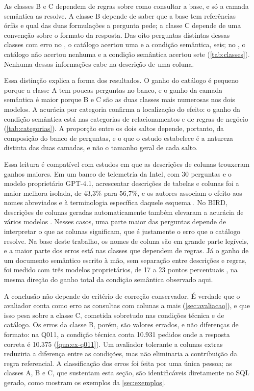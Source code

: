 As classes B e C dependem de regras sobre como consultar a base, e só a
camada semântica as resolve. A classe B depende de saber que a base tem
referências órfãs e qual das duas formulações a pergunta pede; a classe C
depende de uma convenção sobre o formato da resposta. Das oito perguntas
distintas dessas classes com erro no , o catálogo
acertou uma e a condição semântica, seis; no , o
catálogo não acertou nenhuma e a condição semântica acertou sete
(\autoref{tab:classes}). Nenhuma dessas informações cabe na descrição de
uma coluna.

Essa distinção explica a forma dos resultados. O ganho do catálogo é
pequeno porque a classe A tem poucas perguntas no banco, e o ganho da
camada semântica é maior porque B e C são as duas classes mais numerosas
nos dois modelos. A acurácia por categoria confirma a localização do
efeito: o ganho da condição semântica está nas categorias de
relacionamentos e de regras de negócio (\autoref{tab:categorias}). A
proporção entre os dois saltos depende, portanto, da composição do banco
de perguntas, e o que o estudo estabelece é a natureza distinta das duas
camadas, e não o tamanho geral de cada salto.

Essa leitura é compatível com estudos em que as descrições de colunas
trouxeram ganhos maiores. Em um banco de telemetria da Intel, com 30
perguntas e o modelo proprietário GPT-4.1, acrescentar descrições de
tabelas e colunas foi a maior melhora isolada, de 43,3\% para 56,7\%, e os
autores associam o efeito aos nomes abreviados e à terminologia
específica daquele esquema \cite{bouattour2026prompting}. No BIRD,
descrições de colunas geradas automaticamente também elevaram a acurácia
de vários modelos \cite{wretblad2024synthetic}. Nesses casos, uma parte
maior das perguntas depende de interpretar o que as colunas significam,
que é justamente o erro que o catálogo resolve. Na base deste trabalho, os
nomes de coluna são em grande parte legíveis, e a maior parte dos erros
está nas classes que dependem de regras. Já o ganho de um documento
semântico escrito à mão, sem separação entre descrições e regras, foi
medido com três modelos proprietários, de 17 a 23 pontos percentuais
\cite{rumiantsau2026semantic}, na mesma direção do ganho total da
condição semântica observado aqui.

A conclusão não depende do critério de correção conservador. É verdade
que o avaliador conta como erro as consultas com colunas a mais
(\autoref{sec:avaliacao}), e que isso pesa sobre a classe C, cometida
sobretudo nas condições técnica e de catálogo. Os erros da classe B,
porém, são valores errados, e não diferenças de formato: na Q011, a
condição técnica conta 10.931 pedidos onde a resposta correta é 10.375
(\autoref{qua:ex-q011}). Um avaliador tolerante a colunas extras reduziria
a diferença entre as condições, mas não eliminaria a contribuição da regra
referencial. A classificação dos erros foi feita por uma única pessoa;
as classes A, B e C, que sustentam esta seção, são identificáveis
diretamente no SQL gerado, como mostram os exemplos da
\autoref{sec:exemplos}.

